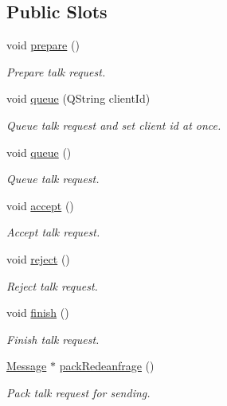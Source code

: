 \subsection*{Public Slots}
\begin{DoxyCompactItemize}
\item 
void \hyperlink{class_redeanfrage_a033cd847599186f92b8ffdb7143e9818}{prepare} ()
\begin{DoxyCompactList}\small\item\em Prepare talk request. \end{DoxyCompactList}\item 
void \hyperlink{class_redeanfrage_a317e2c464a74333b110746ea7ad5dc5c}{queue} (Q\+String client\+Id)
\begin{DoxyCompactList}\small\item\em Queue talk request and set client id at once. \end{DoxyCompactList}\item 
void \hyperlink{class_redeanfrage_a2e4d6dc526ffc7c9c3a654b39ae6a2d5}{queue} ()
\begin{DoxyCompactList}\small\item\em Queue talk request. \end{DoxyCompactList}\item 
void \hyperlink{class_redeanfrage_a4427120a66c68c244117aa1ea96746e3}{accept} ()
\begin{DoxyCompactList}\small\item\em Accept talk request. \end{DoxyCompactList}\item 
void \hyperlink{class_redeanfrage_a0289317466dfdbb6071bd89633258fe2}{reject} ()
\begin{DoxyCompactList}\small\item\em Reject talk request. \end{DoxyCompactList}\item 
void \hyperlink{class_redeanfrage_a8121285b4f17ec8d6c732fff8e34ae3f}{finish} ()
\begin{DoxyCompactList}\small\item\em Finish talk request. \end{DoxyCompactList}\item 
\hyperlink{class_message}{Message} $\ast$ \hyperlink{class_redeanfrage_a55d781a13c089e0559254246b9217fe4}{pack\+Redeanfrage} ()
\begin{DoxyCompactList}\small\item\em Pack talk request for sending. \end{DoxyCompactList}\item 

\end{DoxyCompactItemize}
